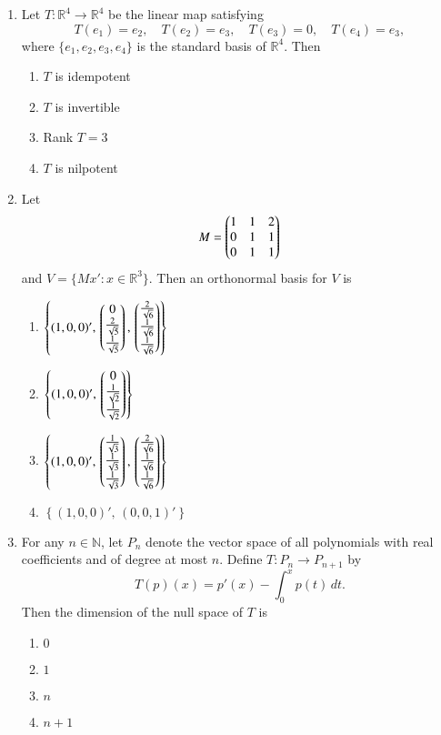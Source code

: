 \documentclass[journal]{IEEEtran}
\numberwithin{equation}{enumi}
\numberwithin{figure}{enumi}
\begin{document}
\begin{enumerate}
\item
Let $T:\mathbb{R}^4 \to \mathbb{R}^4$ be the linear map satisfying
\[
T(e_1) = e_2,\quad T(e_2) = e_3,\quad T(e_3) = 0,\quad T(e_4) = e_3,
\]
where $\{e_1, e_2, e_3, e_4\}$ is the standard basis of $\mathbb{R}^4$. Then
\hfill{}
\begin{multicols}{2}
\begin{enumerate}
\item $T$ is idempotent
\item $T$ is invertible
\item Rank $T = 3$
\item $T$ is nilpotent
\end{enumerate}

\end{multicols}

\item
Let 
\[
M = \begin{pmatrix}1 & 1 & 2 \\ 0 & 1 & 1 \\ 0 & 1 & 1\end{pmatrix}
\]
and $V = \{ M x' : x \in \mathbb{R}^3 \}$. Then an orthonormal basis for $V$ is
\hfill{}
\begin{enumerate}
    \item $\left\{ (1,0,0)',\, \begin{pmatrix}0 \\ \frac{2}{\sqrt{5}} \\ \frac{1}{\sqrt{5}}\end{pmatrix},\, \begin{pmatrix}\frac{2}{\sqrt{6}} \\ \frac{1}{\sqrt{6}} \\ \frac{1}{\sqrt{6}}\end{pmatrix} \right\}$
    \item $\left\{ (1,0,0)',\, \begin{pmatrix}0 \\ \frac{1}{\sqrt{2}} \\ \frac{1}{\sqrt{2}}\end{pmatrix} \right\}$
    \item $\left\{ (1,0,0)',\, \begin{pmatrix}\frac{1}{\sqrt{3}} \\ \frac{1}{\sqrt{3}} \\ \frac{1}{\sqrt{3}}\end{pmatrix},\, \begin{pmatrix}\frac{2}{\sqrt{6}} \\ \frac{1}{\sqrt{6}} \\ \frac{1}{\sqrt{6}}\end{pmatrix} \right\}$
    \item $\left\{ (1,0,0)',\, (0,0,1)' \right\}$
\end{enumerate}

\item
For any $n \in \mathbb{N}$, let $P_n$ denote the vector space of all polynomials with real coefficients and of degree at most $n$. Define $T:P_n \to P_{n+1}$ by
\[
T(p)(x) = p'(x) - \int_0^x p(t) \, dt.
\]
Then the dimension of the null space of $T$ is
\hfill{}
\begin{multicols}{4}
\begin{enumerate}
    \item $0$
    \item $1$
    \item $n$
    \item $n+1$
\end{enumerate}
\end{multicols}



\end{enumerate}
\end{document}
